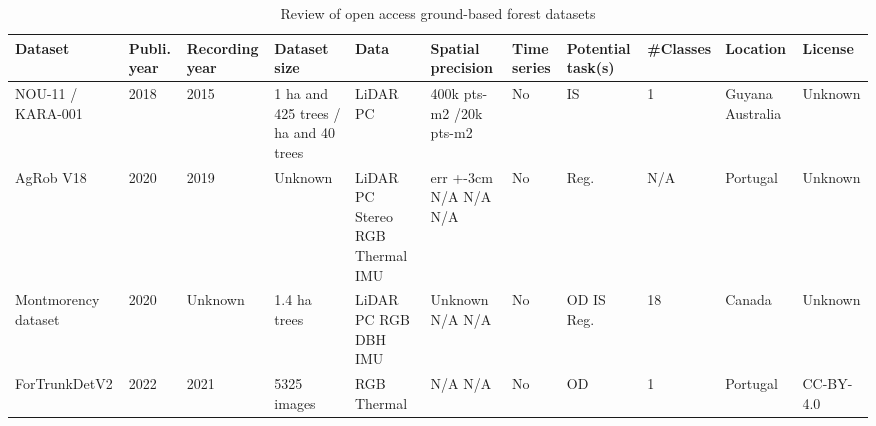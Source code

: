 \documentclass{CUP-JNL-DTM}%
\theoremstyle{definition}
\numberwithin{equation}{section}
\begin{document}
\begin{table*}[t!]
\fontsize{6.5pt}{7.5pt}\selectfont %
\renewcommand{\arraystretch}{1.5} %
\setlength\tabcolsep{5pt} %
\caption{Review of open access ground-based forest datasets}
{\begin{fntable}
\centering
\begin{tabular}{p{1.5cm} | p{0.4cm} | p{1cm} | p{1.3cm} | p{1.2cm} : p{1cm} | p{0.4cm} | p{0.7cm} | p{0.8cm} | p{1cm} | p{1.1cm}}
\toprule
Dataset  & Publi. year & Recording year & Dataset size & Data  & Spatial precision & Time series & Potential task(s) & \#Classes & Location  & License  \\
\midrule

NOU-11 / KARA-001 \cite{burt_extracting_2018} & 2018 & 2015 & 1 ha and 425 trees /  ha and 40 trees & LiDAR PC & 400k pts-m2 /\newline 20k pts-m2 & No & IS & 1 & Guyana \newline Australia & Unknown \\

AgRob V18 \cite{reis_forest_2020} & 2020 & 2019 & Unknown & LiDAR PC \newline Stereo RGB \newline Thermal \newline IMU & err +-3cm \newline N/A \newline N/A \newline N/A & No & Reg. & N/A & Portugal & Unknown \\

Montmorency dataset	\cite{tremblay_automatic_2020} & 2020 & Unknown & 1.4 ha  trees & LiDAR PC \newline RGB \newline DBH \newline IMU & Unknown \newline N/A \newline \newline 3.5cm \newline N/A & No & OD \newline IS \newline Reg. & 18 & Canada & Unknown \\

ForTrunkDetV2 \cite{da_silva_visible_2021, da_silva_unimodal_2021, da_silva_edge_2022} & 2022 & 2021  & 5325 images & RGB \newline Thermal & N/A \newline N/A & No & OD & 1 & Portugal & CC-BY-4.0 \\


\end{tabular}
\end{fntable}}
\end{table*}
\end{document}
